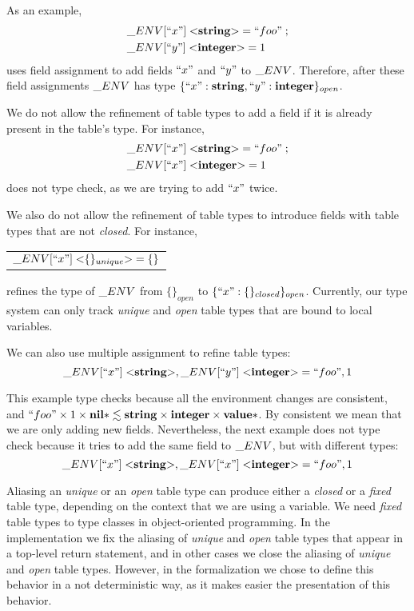 \documentclass{sigplanconf}
\newcommand{\Value}{\mathbf{value}}
\newcommand{\Nil}{\mathbf{nil}}
\newcommand{\Integer}{\mathbf{integer}}
\newcommand{\String}{\mathbf{string}}
\begin{document}
As an example,
\begin{align*}
& \string_ENV[``x"] \; {<}\String{>} = ``foo" \;; \\
& \string_ENV[``y"] \; {<}\Integer{>} = 1
\end{align*}
uses field assignment to add fields $``x"$ and $``y"$ to $\string_ENV$.
Therefore, after these field assignments $\string_ENV$ has type
$\{``x":\String, ``y":\Integer\}_{open}$.

We do not allow the refinement of table types to add a field if it is
already present in the table's type.
For instance,
\begin{align*}
& \string_ENV[``x"] \; {<}\String{>} = ``foo" \;; \\
& \string_ENV[``x"] \; {<}\Integer{>} = 1
\end{align*}
does not type check, as we are trying to add $``x"$ twice.

We also do not allow the refinement of table types to introduce
fields with table types that are not \emph{closed}.
For instance,
\begin{center}
\begin{tabular}{l}
$\string_ENV[``x"] \; {<}\{\}_{unique}{>} = \{\}$
\end{tabular}
\end{center}
refines the type of $\string_ENV$ from $\{\}_{open}$ to $\{``x":\{\}_{closed}\}_{open}$.
Currently, our type system can only track \emph{unique} and
\emph{open} table types that are bound to local variables.

We can also use multiple assignment to refine table types:
\[
\string_ENV[``x"] \; {<}\String{>}, \string_ENV[``y"] \; {<}\Integer{>} = ``foo", 1
\]

This example type checks because all the environment changes are consistent, and
$``foo" \times 1 \times \Nil{*} \lesssim \String \times \Integer \times \Value{*}$.
By consistent we mean that we are only adding new fields.
Nevertheless, the next example does not type check because it tries to add
the same field to $\string_ENV$, but with different types:
\[
\string_ENV[``x"] \; {<}\String{>}, \string_ENV[``x"] \; {<}\Integer{>} = ``foo", 1
\]

Aliasing an \emph{unique} or an \emph{open} table type can produce
either a \emph{closed} or a \emph{fixed} table type, depending on
the context that we are using a variable.
We need \emph{fixed} table types to type classes in object-oriented programming.
In the implementation we fix the aliasing of \emph{unique} and \emph{open}
table types that appear in a top-level return statement, and in other cases we
close the aliasing of \emph{unique} and \emph{open} table types.
However, in the formalization we chose to define this behavior in
a not deterministic way, as it makes easier the presentation of this behavior.
\end{document}
